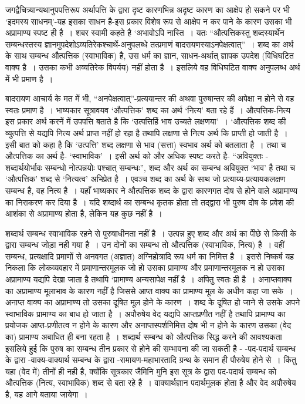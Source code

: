 जगद्वैचित्र्यान्यथानुपपत्तिरूप अर्थापत्ति के द्वारा दृष्ट कारणभिन्न अदृष्ट कारण का आक्षेप हो सकने पर भी ‘इदमस्य साधनम्'-यह इसका साधन है-इस प्रकार विशेष रूप से आक्षेप न कर पाने के कारण उसका भी अप्रामाण्य स्पष्ट ही है~। शबर स्वामी कहते है ‘अभावोऽपि नास्ति~। यतः “औत्पत्तिकस्तु शब्दस्यार्थेन सम्बन्धस्तस्य ज्ञानमुपदेशोऽव्यतिरेकश्चार्थे-अनुपलब्धे तत्प्रमाणं बादरायणस्याऽनपेक्षत्वात्”~। शब्द का अर्थ के साथ सम्बन्ध औत्पत्तिक (स्वाभाविक) है, उस धर्म का ज्ञान, साधन-अर्थात् ज्ञापक उपदेश (विधिघटित वाक्य है~। उसका कभी अव्यतिरेक विपर्यय) नहीं होता है~। इसलिये वह विधिघटित वाक्य अनुपलब्ध अर्थ में भी प्रमाण है~।

बादरायण आचार्य के मत में भी, “अनपेक्षत्वात्”-प्रत्ययान्तर की अथवा पुरुषान्तर की अपेक्षा न होने से वह स्वतः प्रमाण है~। भाष्यकार सूत्रावयव ‘औत्पत्तिक' शब्द का अर्थ ‘नित्य' बता रहे हैं~। औत्पत्तिक-नित्य इस प्रकार अर्थ करनें में उपपत्ति बताते है कि ‘उत्पत्तिर्हि भाव उच्यते लक्षणया'~। ‘औत्पत्तिक शब्द की व्युत्पत्ति से यद्यपि नित्य अर्थ प्राप्त नहीं हो रहा है तथापि लक्षणा से नित्य अर्थ कि प्राप्ती हो जाती है~। इसी बात को कहा है कि ‘उत्पत्ति' शब्द लक्षणा से भाव (सत्ता) स्वभाव अर्थ को बतलाता है~। तथा च औत्पत्तिक का अर्थ है- ‘स्वाभाविक'~। इसी अर्थ को और अधिक स्पष्ट करते है- “अवियुक्तः - शब्दार्थयोर्भावः सम्बन्धो नोत्पन्नयोः पश्चात् सम्बन्धः”, शब्द और अर्थ का सम्बन्ध अवियुक्त ‘भाव' है तथा च ‘औत्पत्तिक' शब्द से ‘नित्यत्व' अभिप्रेत है~। एवञ्च शब्द का अर्थ के साथ जो प्रत्याय्य-प्रत्यायकलक्षण सम्बन्ध है, वह नित्य है~। यहाँ भाष्यकार ने औत्पत्तिक शब्द के द्वारा कारणगत दोष से होने वाले अप्रामाण्य का निराकरण कर दिया है~। यदि शब्दार्थ का सम्बन्ध कृतक होता तो तद्द्वारा भी पुरुष दोष के प्रवेश की आशंका से अप्रामाण्य होता है, लेकिन यह कुछ नहीं है~। 

शब्दार्थ सम्बन्ध स्वाभाविक रहने से पुरुषाधीनता नहीं है~। उत्पन्न हुए शब्द और अर्थ का पीेछे से किसी के द्वारा सम्बन्ध जोड़ा नही गया है~। उन दोनों का सम्बन्ध तो औत्पत्तिक (स्वाभाविक, नित्य) है~। वहीं सम्बन्ध, प्रत्यक्षादि प्रमाणों से अनवगत (अज्ञात) अग्निहोत्रादि रूप धर्म का निमित्त है~। इससे निष्कर्ष यह निकला कि लोकव्यवहार में प्रमाणान्तरमूलक जो हो उसका प्रामाण्य और प्रमाणान्तरमूलक न हो उसका अप्रामाण्य यद्यपि देखा जाता है तथापि ‘प्रामाण्य अन्यसापेक्ष नहीं है~। अपितु स्वतः ही है~। अनाप्तवाक्य का अप्रामाण्य मूलाभाव के कारण नहीं है जिससे आप्त वाक्य का प्रामाण्य मूल के अधीन कहा जा सके~। अनाप्त वाक्य का अप्रामाण्य तो उसका दूषित मूल होने के कारण~। शब्द के दूषित हो जाने से उसके अपने स्वाभाविक प्रामाण्य का बाध हो जाता है~। अपौरुषेय वेद यद्यपि आप्तप्रणीत नहीं है तथापि प्रामाण्य का प्रयोजक आप्त-प्रणीतत्व न होने के कारण और अनाप्तस्पर्शनिमित्त दोष भी न होने के कारण उसका (वेद का) प्रामाण्य अबाधित ही बना रहता है~। शब्दार्थ सम्बन्ध को औत्पत्तिक सिद्ध करने की आवश्यकता इसलिये हुई कि पुरुष का सम्बन्ध तीन प्रकार से होने की सम्भावना की जा सकती है - -पद-पदार्थ सम्बन्ध के द्वारा -वाक्य-वाक्यार्थ सम्बन्ध के द्वारा -रामायण-महाभारतादि ग्रन्थ के समान ही पौरुषेय होने से~। किंतु यहा (वेद में) तीनों ही नही है, क्योंकि सूत्रकार जैमिनि मुनि इस सूत्र के द्वारा पद-पदार्थ सम्बन्ध को औत्पत्तिक (नित्य, स्वाभाविक) शब्द से बता रहे है~। वाक्यार्थज्ञान पदार्थमूलक होता है और वेद अपौरुषेय है, यह आगे बताया जायेगा~। 

